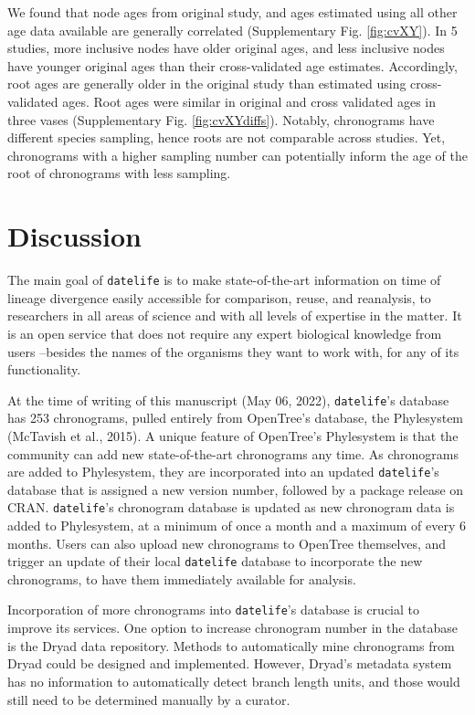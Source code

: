\documentclass[
  english,
  man]{apa6}
\begin{document}
We found that node ages from original study, and ages estimated using all other age data available are generally correlated (Supplementary Fig. \ref{fig:cvXY}).
In 5 studies, more inclusive nodes have older original ages, and less inclusive nodes have younger original ages than their cross-validated age estimates.
Accordingly, root ages are generally older in the original study than estimated using cross-validated ages. Root ages were similar in original and cross validated ages in three vases (Supplementary Fig. \ref{fig:cvXYdiffs}).
Notably, chronograms have different species sampling, hence roots are not comparable across studies. Yet, chronograms with a higher sampling number can potentially inform the age of the root of chronograms with less sampling.

\hypertarget{discussion}{%
\section{Discussion}\label{discussion}}

The main goal of \texttt{datelife} is to make state-of-the-art information on time of lineage divergence easily accessible for comparison, reuse, and reanalysis, to researchers in all areas of science and with all levels of expertise in the matter. It is an open service that does not require any expert biological knowledge from users --besides the names of the organisms they want to work with, for any of its functionality.

At the time of writing of this manuscript (May 06, 2022), \texttt{datelife}'s database has 253 chronograms, pulled entirely from OpenTree's database, the Phylesystem (McTavish et al., 2015). A unique feature of OpenTree's Phylesystem is that the community can add new state-of-the-art chronograms any time. As chronograms are added to Phylesystem, they are incorporated into an updated \texttt{datelife}'s database that is assigned a new version number, followed by a package release on CRAN. \texttt{datelife}'s chronogram database is updated as new chronogram data is added to Phylesystem, at a minimum of once a month and a maximum of every 6 months.
Users can also upload new chronograms to OpenTree themselves, and trigger an update of their local \texttt{datelife} database to incorporate the new chronograms, to have them immediately available for analysis.

Incorporation of more chronograms into \texttt{datelife}'s database is crucial to improve its services. One option to increase chronogram number in the database is the Dryad data repository. Methods to automatically mine chronograms from Dryad could be designed and implemented. However, Dryad's metadata system has no information to automatically detect branch length units, and those would still need to be determined manually by a curator.
\end{document}
